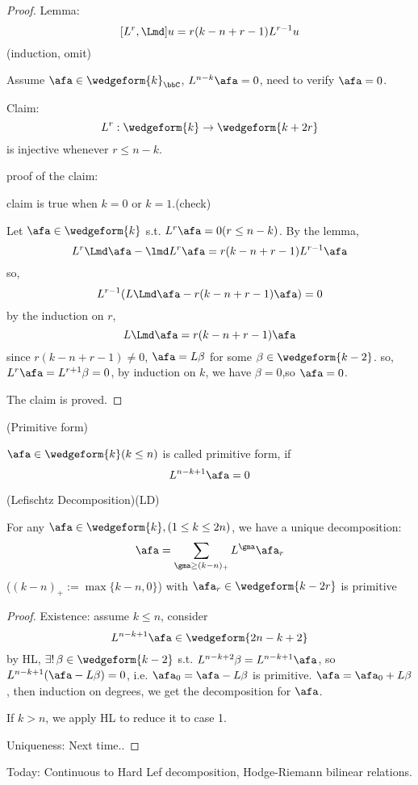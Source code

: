 \begin{proof}

Lemma:
$$[L^r,\Lmd]u=r(k-n+r-1)L^{r-1}u$$
(induction, omit)

Assume $\afa\in\wedgeform{k}_\bbC$, $L^{n-k}\afa=0$,
need to verify $\afa=0$.

Claim:
$$L^r:\wedgeform{k}\to\wedgeform{k+2r}$$
is injective whenever $r\leq n-k$.

proof of the claim:

claim is true when $k=0$ or $k=1$.(check)

Let $\afa\in \wedgeform{k}$ s.t. $L^r\afa=0(r\leq n-k)$.
By the lemma,
$$L^r\Lmd\afa-\lmd L^r\afa=r(k-n+r-1)L^{r-1}\afa$$
so,
$$L^{r-1}(L\Lmd\afa-r(k-n+r-1)\afa)=0$$
by the induction on $r$,
$$L\Lmd\afa=r(k-n+r-1)\afa$$
since $r(k-n+r-1)\neq 0$, $\afa=L\beta$ for some $\beta\in\wedgeform{k-2}$.
so,$L^r\afa=L^{r+1}\beta=0$, by induction on $k$, we have
$\beta=0$,so $\afa=0$.

The claim is proved.
\end{proof}

\begin{definition}(Primitive form)

$\afa\in\wedgeform{k}(k\leq n)$ is called primitive form, if
$$L^{n-k+1}\afa=0$$
\end{definition}

\begin{cor}(Lefischtz Decomposition)(LD)

For any $\afa\in\wedgeform{k},(1\leq k\leq 2n)$,
we have a unique decomposition:
$$
  \afa
=
  \sum_{\gma\geq(k-n)_+}
    L^\gma\afa_r
$$
($(k-n)_+:=\max\{k-n,0\}$)
with $\afa_r\in\wedgeform{k-2r}$ is primitive
\end{cor}

\begin{proof}
Existence: assume $k\leq n$, consider
$$L^{n-k+1}\afa\in\wedgeform{2n-k+2}$$
by HL, $\exists !\,\beta\in\wedgeform{k-2}$ s.t.
$L^{n-k+2}\beta=L^{n-k+1}\afa$, so
$L^{n-k+1}(\afa-L\beta)=0$, i.e. $\afa_0=\afa-L\beta$
is primitive. $\afa=\afa_0+L\beta$, then induction on degrees,
we get the decomposition for $\afa$.

If $k>n$, we apply HL to reduce it to case 1.

Uniqueness: Next time..
\end{proof}


Today: Continuous to Hard Lef decomposition, Hodge-Riemann bilinear relations.

